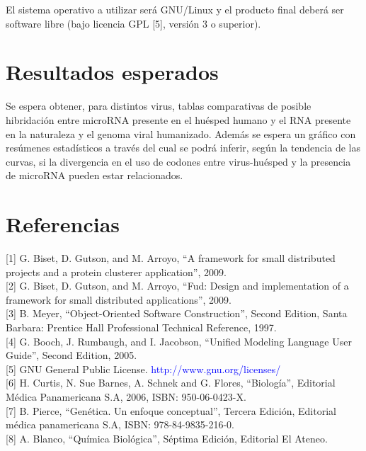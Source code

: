 \documentclass[12pt,a4paper]{article}
\begin{document}
\par El sistema operativo a utilizar será GNU/Linux y el producto final deberá ser software libre (bajo licencia GPL [5], versión 3 o superior).

\section{Resultados esperados}
Se espera obtener, para distintos virus, tablas comparativas de posible hibridación entre microRNA presente en el huésped humano y el RNA presente en la naturaleza y el genoma viral humanizado. Además se espera un gráfico con resúmenes estadísticos a través del cual se podrá inferir, según la tendencia de las curvas, si la divergencia en el uso de codones entre virus-huésped y la presencia de microRNA pueden estar relacionados.


\section*{Referencias}
[1] G. Biset, D. Gutson, and M. Arroyo, “A framework for small distributed projects and a protein clusterer application”, 2009. \\

[2] G. Biset, D. Gutson, and M. Arroyo, “Fud: Design and implementation of a framework for small distributed applications”, 2009. \\

[3] B. Meyer, “Object-Oriented Software Construction”, Second Edition, Santa Barbara: Prentice Hall Professional Technical Reference, 1997. \\

[4] G. Booch, J. Rumbaugh, and I. Jacobson, “Unified Modeling Language User Guide”, Second Edition, 2005. \\

[5] GNU General Public License. \textcolor{blue}{http://www.gnu.org/licenses/} \\

[6] H. Curtis, N. Sue Barnes, A. Schnek and G. Flores, “Biología”, Editorial Médica Panamericana S.A, 2006, ISBN: 950-06-0423-X. \\

[7] B. Pierce, “Genética. Un enfoque conceptual”, Tercera Edición, Editorial médica panamericana S.A, ISBN: 978-84-9835-216-0. \\

[8] A. Blanco, “Química Biológica”, Séptima Edición, Editorial El Ateneo. \\
\end{document}
